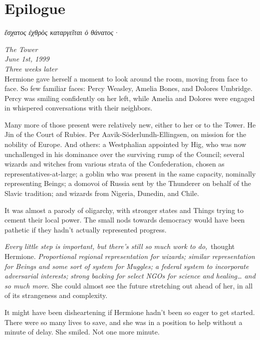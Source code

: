\Startbonus

\hypertarget{epilogue}{%
\chapter{Epilogue}\label{epilogue}}

\foreignlanguage{greek}{\textgreek{\emph{ἔσχατος ἐχθρὸς καταργεῖται ὁ
θάνατος·}}}

\mybreak

\emph{The Tower}\\
\emph{June 1st, 1999}\\
\emph{Three weeks later}\\

Hermione gave herself a moment to look around the room, moving from face
to face. So few familiar faces: Percy Weasley, Amelia Bones, and Dolores
Umbridge. Percy was smiling confidently on her left, while Amelia and
Dolores were engaged in whispered conversations with their neighbors.

Many more of those present were relatively new, either to her or to the
Tower. He Jin of the Court of Rubies. Per Aavik-Söderlundh-Ellingsen, on
mission for the nobility of Europe. And others: a Westphalian appointed
by Hig, who was now unchallenged in his dominance over the surviving
rump of the Council; several wizards and witches from various strata of
the Confederation, chosen as representatives-at-large; a goblin who was
present in the same capacity, nominally representing Beings; a domovoi
of Russia sent by the Thunderer on behalf of the Slavic tradition; and
wizards from Nigeria, Dunedin, and Chile.

It was almost a parody of oligarchy, with stronger states and Things
trying to cement their local power. The small nods towards democracy
would have been pathetic if they hadn't actually represented progress.

\emph{Every little step is important, but there's still so much work to
do,}~thought Hermione. \emph{Proportional regional representation for
wizards; similar representation for Beings and some sort of system for
Muggles; a federal system to incorporate adversarial interests; strong
backing for select NGOs for science and healing\ldots{} and so much
more}. She could almost see the future stretching out ahead of her, in
all of its strangeness and complexity.

It might have been disheartening if Hermione hadn't been so eager to get
started. There were so many lives to save, and she was in a position to
help without a minute of delay. She smiled. Not one more minute.

